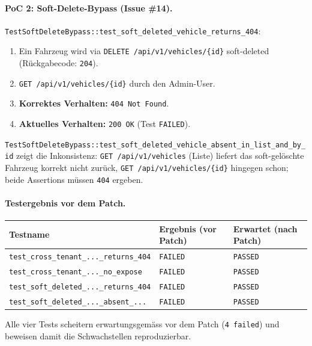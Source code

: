 \paragraph{PoC 2: Soft-Delete-Bypass (Issue \#14).}
\texttt{TestSoftDeleteBypass::test\_soft\_deleted\_vehicle\_returns\_404}:
\begin{enumerate}
    \item Ein Fahrzeug wird via \texttt{DELETE /api/v1/vehicles/\{id\}} soft-deleted
          (Rückgabecode: \texttt{204}).
    \item \texttt{GET /api/v1/vehicles/\{id\}} durch den Admin-User.
    \item \textbf{Korrektes Verhalten:} \texttt{404 Not Found}.
    \item \textbf{Aktuelles Verhalten:} \texttt{200 OK} (Test \texttt{FAILED}).
\end{enumerate}

\texttt{TestSoftDeleteBypass::test\_soft\_deleted\_vehicle\_absent\_in\_list\_and\_by\_id}
zeigt die Inkonsistenz: \texttt{GET /api/v1/vehicles} (Liste) liefert das
soft-gelöschte Fahrzeug korrekt nicht zurück, \texttt{GET /api/v1/vehicles/\{id\}}
hingegen schon; beide Assertions müssen \texttt{404} ergeben.

\paragraph{Testergebnis vor dem Patch.}
\begin{center}
    \begin{tabular}{lll}
        \hline
        \textbf{Testname}                               & \textbf{Ergebnis (vor Patch)} & \textbf{Erwartet (nach Patch)} \\
        \hline
        \texttt{test\_cross\_tenant\_...\_returns\_404} & \texttt{FAILED}               & \texttt{PASSED}                \\
        \texttt{test\_cross\_tenant\_...\_no\_expose}   & \texttt{FAILED}               & \texttt{PASSED}                \\
        \texttt{test\_soft\_deleted\_...\_returns\_404} & \texttt{FAILED}               & \texttt{PASSED}                \\
        \texttt{test\_soft\_deleted\_...\_absent\_...}  & \texttt{FAILED}               & \texttt{PASSED}                \\
        \hline
    \end{tabular}
\end{center}

\vspace{0.5em}
\noindent Alle vier Tests scheitern erwartungsgemäss vor dem Patch
(\texttt{4 failed}) und beweisen damit die Schwachstellen reproduzierbar.

